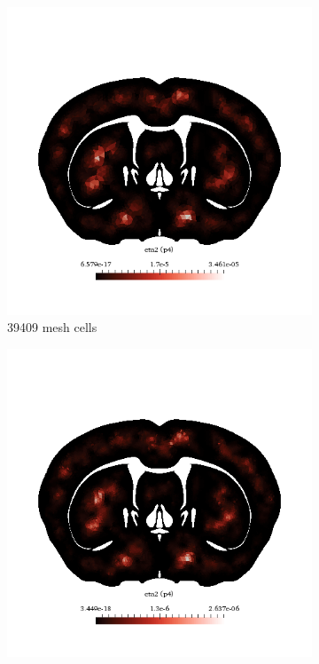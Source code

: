 \begin{figure}[h!]
  \centering
    \begin{subfigure}[b]{0.49\textwidth}
    \includegraphics[width=\textwidth,height=\textheight,keepaspectratio,height=\textheight,keepaspectratio]{figures/4_mpet/biomedical/space/eta2_p4_1.png}
    \caption{39409 mesh cells}
  \end{subfigure}
  \begin{subfigure}[b]{0.49\textwidth}
    \includegraphics[width=\textwidth,height=\textheight,keepaspectratio,height=\textheight,keepaspectratio]{figures/4_mpet/biomedical/space/eta2_p4_2.png}

\end{subfigure}
\end{figure}
